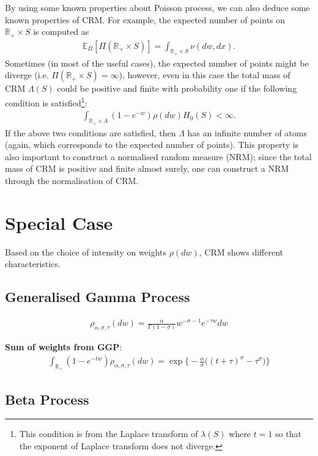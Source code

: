 \documentclass{article}
\begin{document}
By using some known properties about Poisson process, we can also deduce some known properties of CRM. For example, the expected number of points on $\mathbb{R}_+ \times S$ is computed as
\begin{align}
\mathbb{E}_\Pi[\Pi(\mathbb{R}_+ \times S)] = \int_{\mathbb{R}_+ \times S} \nu(dw,dx).
\end{align}
Sometimes (in most of the useful cases), the expected number of points might be diverge (i.e. $\Pi(\mathbb{R}_+ \times S) = \infty$), however, even in this case the total mass of CRM $\Lambda(S)$ could be positive and finite with probability one if the following condition is satisfied\footnote{This condition is from the Laplace transform of $\lambda(S)$ where $t=1$ so that the exponent of Laplace transform does not diverge.}:
\begin{align}
\int_{\mathbb{R}_+ \times A} (1- e^{-w}) \rho(dw)H_0(S) < \infty.
\end{align}
If the above two conditions are satisfied, then $\Lambda$ has an infinite number of atoms (again, which corresponds to the expected number of points). This property is also important to construct a normalised random measure (NRM); since the total mass of CRM is positive and finite almost surely, one can construct a NRM through the normalisation of CRM.

\section{Special Case}
Based on the choice of intensity on weights $\rho(dw)$, CRM shows different characteristics. 

\subsection{Generalised Gamma Process}

\begin{align}
\rho_{\alpha, \sigma, \tau}(dw) = \frac{\alpha}{\Gamma(1-\sigma)}w^{-\sigma - 1}e^{-\tau w} dw
\end{align}

\textbf{Sum of weights from GGP}:
\begin{align}
\int_{\mathbb{R}_+} (1- e^{-tw}) \rho_{\alpha, \sigma, \tau}(dw) = \exp\bigg\{-\frac{\alpha}{\sigma}\big((t+\tau)^\sigma - \tau^\sigma\big)\bigg\}
\end{align}

\subsection{Beta Process}




\end{document}
